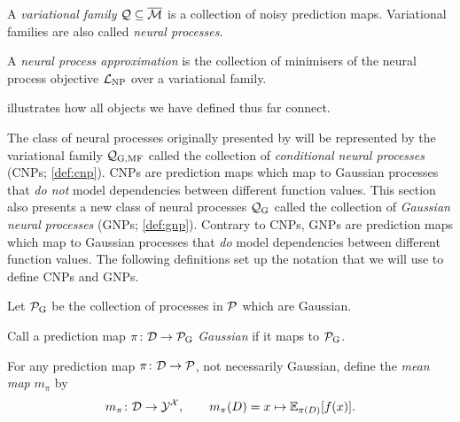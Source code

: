 \documentclass[12pt, twoside]{report}
\begin{document}
\begin{definition}
    \label{def:neural_process}
    A \emph{variational family} $\mathcal{Q} \subseteq \overline{\mathcal{M}}$ is a collection of noisy prediction maps.
    Variational families are also called \emph{neural processes}.
\end{definition}

\begin{definition}
    \label{def:neural_process_approximation}
    A \emph{neural process approximation} is the collection of minimisers of the neural process objective $\L\ss{NP}$ over a variational family.
\end{definition}

 illustrates how all objects we have defined thus far connect.

The class of neural processes originally presented by \textcite{Garnelo:2018:Conditional_Neural_Processes} will be represented by the variational family $\Qc\ss{G,MF}$ called the collection of \emph{conditional neural processes} (CNPs; \cref{def:cnp}).
CNPs are prediction maps which map to Gaussian processes that \emph{do not} model dependencies between different function values.
This section also presents a new class of neural processes $\Qc\ss{G}$
called the collection of \emph{Gaussian neural processes} (GNPs; \cref{def:gnp}).
Contrary to CNPs, GNPs are prediction maps which map to Gaussian processes that \emph{do} model dependencies between different function values.
The following definitions set up the notation that we will use to define CNPs and GNPs.

\begin{definition}
    Let $\Pc\ss{G}$ be the collection of processes in $\mathcal{P}$ which are Gaussian.
\end{definition}

\begin{definition}
    Call a prediction map $\pi \colon \D \to \Pc\ss{G}$ \emph{Gaussian} if it maps to $\Pc\ss{G}$.
\end{definition}

\begin{definition}
    \label{def:mean_map}
    For any prediction map $\pi \colon \mathcal{D} \to \mathcal{P}$, not necessarily Gaussian, define the \emph{mean map} $m_\pi$ by
    \begin{equation}
        m_\pi\colon \mathcal{D} \to \mathcal{Y}^{\mathcal{X}}, \qquad
        m_\pi(D)= x \mapsto \mathbb{E}_{\pi(D)}[f(x)].
    \end{equation}
\end{definition}
\end{document}
